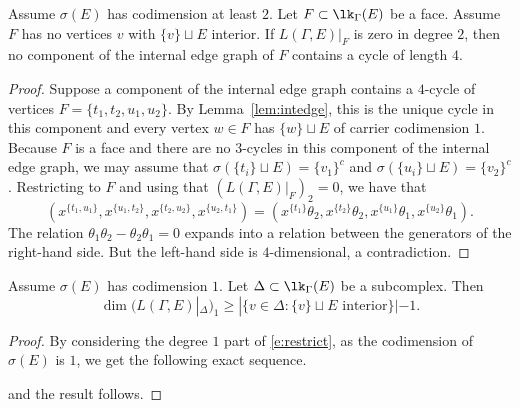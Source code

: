 \begin{lemma}\label{lem:nofourcycle}
Assume $\sigma(E)$ has codimension at least $2$. Let $F \subset \lk_{\Gamma}(E)$ be a face. Assume $F$ has no vertices $v$ with $\{v\} \sqcup E$ interior. If $L(\Gamma, E)|_{F}$ is zero in degree $2$, then no component of the internal edge graph of $F$ contains a cycle of length $4$. 
\end{lemma}
\begin{proof}
Suppose a component of the internal edge graph contains a $4$-cycle of vertices $F = \{t_1, t_2, u_1, u_2\}$. By Lemma~\ref{lem:intedge}, this is the unique cycle in this component and every vertex $w \in F$ has $\{w\} \sqcup E$ of carrier codimension $1$. Because $F$ is a face and there are no $3$-cycles in this component of the internal edge graph, we may assume that $\sigma(\{t_i\} \sqcup E) = \{v_1\}^c$ and $\sigma(\{u_i\} \sqcup E) = \{v_2\}^c$. Restricting to $F$ and using that $(L(\Gamma, E)|_{F})_2 = 0$, we have that 
$$(x^{\{ t_1, u_1 \}}, x^{ \{ u_1, t_2\}}, x^{\{t_2,u_2\}}, x^{\{u_2, t_1\}}) = (x^{\{t_1\}} \theta_{2}, x^{\{t_2\}} \theta_{2}, x^{\{u_1\}} \theta_{1}, x^{\{u_2\}} \theta_{1}).$$
The relation $\theta_{1} \theta_{2} - \theta_{2} \theta_{1} = 0$ expands into a relation between the generators of the right-hand side. But the left-hand side is $4$-dimensional, a contradiction.
\end{proof}

\begin{lemma}\label{lem:cd1case}
Assume $\sigma(E)$ has codimension $1$. Let $\Delta \subset \lk_{\Gamma}(E)$ be a subcomplex. Then 
$$\dim (L(\Gamma, E)|_{\Delta})_1 \ge |\{v \in \Delta: \{v\} \sqcup E \text{ interior}\}| - 1.$$
\end{lemma}
\begin{proof}
By considering the degree $1$ part of \eqref{e:restrict}, as the codimension of $\sigma(E)$ is $1$, 
we get the following exact sequence.
\begin{center}
\end{center}
and the result follows. 
\end{proof}


